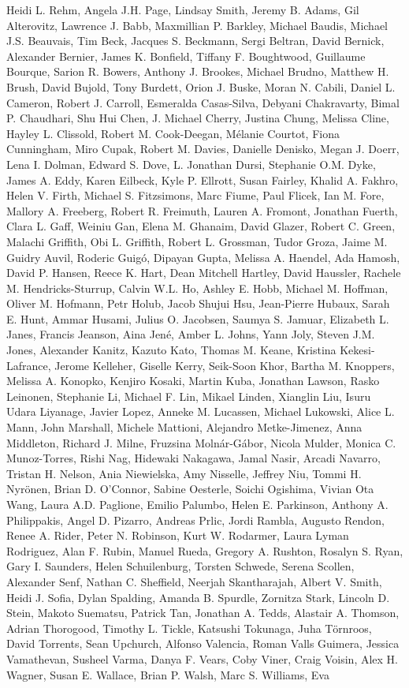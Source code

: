 \documentclass[10pt,letterpaper]{article}
\begin{document}
\begin{thebibliography}{10}
\begin{small}
Heidi L. Rehm, Angela J.H. Page, Lindsay Smith, Jeremy B. Adams, Gil Alterovitz, Lawrence J. Babb, Maxmillian P. Barkley, Michael Baudis, Michael J.S. Beauvais, Tim Beck, Jacques S. Beckmann, Sergi Beltran, David Bernick, Alexander Bernier, James K. Bonfield, Tiffany F. Boughtwood, Guillaume Bourque, Sarion R. Bowers, Anthony J. Brookes, Michael Brudno, Matthew H. Brush, David Bujold, Tony Burdett, Orion J. Buske, Moran N. Cabili, Daniel L. Cameron, Robert J. Carroll, Esmeralda Casas-Silva, Debyani Chakravarty, Bimal P. Chaudhari, Shu Hui Chen, J. Michael Cherry, Justina Chung, Melissa Cline, Hayley L. Clissold, Robert M. Cook-Deegan, Mélanie Courtot, Fiona Cunningham, Miro Cupak, Robert M. Davies, Danielle Denisko, Megan J. Doerr, Lena I. Dolman, Edward S. Dove, L. Jonathan Dursi, Stephanie O.M. Dyke, James A. Eddy, Karen Eilbeck, Kyle P. Ellrott, Susan Fairley, Khalid A. Fakhro, Helen V. Firth, Michael S. Fitzsimons, Marc Fiume, Paul Flicek, Ian M. Fore, Mallory A. Freeberg, Robert R. Freimuth, Lauren A. Fromont, Jonathan Fuerth, Clara L. Gaff, Weiniu Gan, Elena M. Ghanaim, David Glazer, Robert C. Green, Malachi Griffith, Obi L. Griffith, Robert L. Grossman, Tudor Groza, Jaime M. Guidry Auvil, Roderic Guigó, Dipayan Gupta, Melissa A. Haendel, Ada Hamosh, David P. Hansen, Reece K. Hart, Dean Mitchell Hartley, David Haussler, Rachele M. Hendricks-Sturrup, Calvin W.L. Ho, Ashley E. Hobb, Michael M. Hoffman, Oliver M. Hofmann, Petr Holub, Jacob Shujui Hsu, Jean-Pierre Hubaux, Sarah E. Hunt, Ammar Husami, Julius O. Jacobsen, Saumya S. Jamuar, Elizabeth L. Janes, Francis Jeanson, Aina Jené, Amber L. Johns, Yann Joly, Steven J.M. Jones, Alexander Kanitz, Kazuto Kato, Thomas M. Keane, Kristina Kekesi-Lafrance, Jerome Kelleher, Giselle Kerry, Seik-Soon Khor, Bartha M. Knoppers, Melissa A. Konopko, Kenjiro Kosaki, Martin Kuba, Jonathan Lawson, Rasko Leinonen, Stephanie Li, Michael F. Lin, Mikael Linden, Xianglin Liu, Isuru Udara Liyanage, Javier Lopez, Anneke M. Lucassen, Michael Lukowski, Alice L. Mann, John Marshall, Michele Mattioni, Alejandro Metke-Jimenez, Anna Middleton, Richard J. Milne, Fruzsina Molnár-Gábor, Nicola Mulder, Monica C. Munoz-Torres, Rishi Nag, Hidewaki Nakagawa, Jamal Nasir, Arcadi Navarro, Tristan H. Nelson, Ania Niewielska, Amy Nisselle, Jeffrey Niu, Tommi H. Nyrönen, Brian D. O’Connor, Sabine Oesterle, Soichi Ogishima, Vivian Ota Wang, Laura A.D. Paglione, Emilio Palumbo, Helen E. Parkinson, Anthony A. Philippakis, Angel D. Pizarro, Andreas Prlic, Jordi Rambla, Augusto Rendon, Renee A. Rider, Peter N. Robinson, Kurt W. Rodarmer, Laura Lyman Rodriguez, Alan F. Rubin, Manuel Rueda, Gregory A. Rushton, Rosalyn S. Ryan, Gary I. Saunders, Helen Schuilenburg, Torsten Schwede, Serena Scollen, Alexander Senf, Nathan C. Sheffield, Neerjah Skantharajah, Albert V. Smith, Heidi J. Sofia, Dylan Spalding, Amanda B. Spurdle, Zornitza Stark, Lincoln D. Stein, Makoto Suematsu, Patrick Tan, Jonathan A. Tedds, Alastair A. Thomson, Adrian Thorogood, Timothy L. Tickle, Katsushi Tokunaga, Juha Törnroos, David Torrents, Sean Upchurch, Alfonso Valencia, Roman Valls Guimera, Jessica Vamathevan, Susheel Varma, Danya F. Vears, Coby Viner, Craig Voisin, Alex H. Wagner, Susan E. Wallace, Brian P. Walsh, Marc S. Williams, Eva 
\end{small}
\end{thebibliography}
\end{document}

